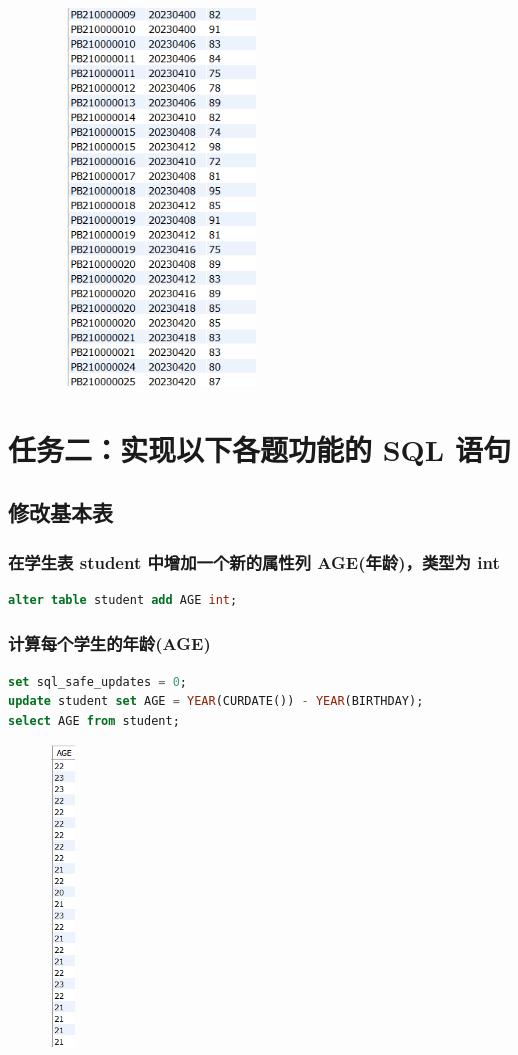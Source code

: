 \documentclass{ctexart}
\begin{document}
					\begin{figure}[H]
						\centering 
						\includegraphics[height=10cm,width=6cm]{6.png}
						\end{figure}
\section{任务二：实现以下各题功能的 SQL 语句}

\subsection{修改基本表}
\subsubsection{在学生表 student 中增加一个新的属性列 AGE(年龄)，类型为 int}
\begin{lstlisting}[language=sql]
	alter table student add AGE int;  
\end{lstlisting}
\subsubsection{计算每个学生的年龄(AGE)}
\begin{lstlisting}[language=sql]
set sql_safe_updates = 0;  
update student set AGE = YEAR(CURDATE()) - YEAR(BIRTHDAY);  
select AGE from student;  
\end{lstlisting}
\begin{figure}[H]
	\centering 
	\includegraphics[height=8cm,width=0.8cm]{7.png}
	\end{figure}
\end{document}
